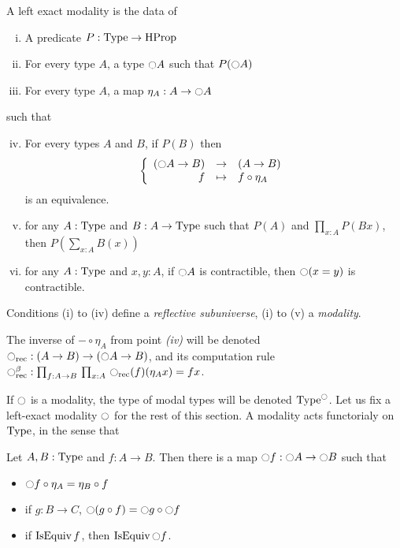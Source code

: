 \begin{defi}
  \label{def:modality}
  A left exact modality is the data of
  \begin{enumerate}[(i)]
  \item A predicate $P:\operatorname{Type} \to \operatorname{HProp}$
  \item For every type $A$, a type
    $\ocircle A$ such that $P(\ocircle A)$
  \item For every type $A$, a map $\eta_A:A \to
    \ocircle A$
  \end{enumerate}
  such that
  \begin{enumerate}[(i)]
    \setcounter{enumi}{3}
  \item For every types $A$ and $B$, if $P(B)$ then
    \[ \left\{
        \begin{array}{rcl}
          (\ocircle A \to B) & \to & (A \to B) \\
          f & \mapsto & f \circ \eta_A
        \end{array} \right. \] %
    is an equivalence.
  \item for any $A:\operatorname{Type}$ and $B:A \to \operatorname{Type}$ such that $P(A)$
    and $\prod_{x:A} P(B x)$, then $P\left( \sum_{x:A} B(x)\right)$
  \item for any $A:\operatorname{Type}$ and $x,y:A$, if $\ocircle A$ is
    contractible, then $\ocircle (x=y)$ is contractible.
  \end{enumerate}
  Conditions (i) to (iv) define a {\em reflective subuniverse}, (i) to
  (v) a {\em modality}.
\end{defi}

\begin{nota}
  The inverse of $- \circ \eta_A$ from point {\itshape (iv)} will be
  denoted $\ocircle_{\mathrm{rec}}: (A\to B) \to (\ocircle A \to B)$, and its
  computation rule $\ocircle_{\mathrm{rec}}^\beta : \prod_{f:A \to B}\, \prod_{x:A}\, \ocircle_{\mathrm{rec}}(f) (\eta_A x) = f x$.
\end{nota}

If $\ocircle$ is a modality, the type of modal types will be denoted
$\operatorname{Type}^{\ocircle}$. Let us fix a left-exact modality $\ocircle$ for the rest
of this section. A modality acts functorialy on $\operatorname{Type}$, in the sense
that

\begin{lem}
  Let $A,B:\operatorname{Type}$ and $f:A\to B$. Then there is a map $\ocircle f:\ocircle
  A \to \ocircle B$ such that 
  \begin{itemize}
  \item $\ocircle f \circ \eta_A = \eta_B \circ f$
  \item if $g:B\to C$, $\ocircle (g \circ f) = \ocircle g \circ \ocircle f$
  \item if $\operatorname{IsEquiv} f$, then $\operatorname{IsEquiv} \ocircle f$.
  \end{itemize}
\end{lem}

